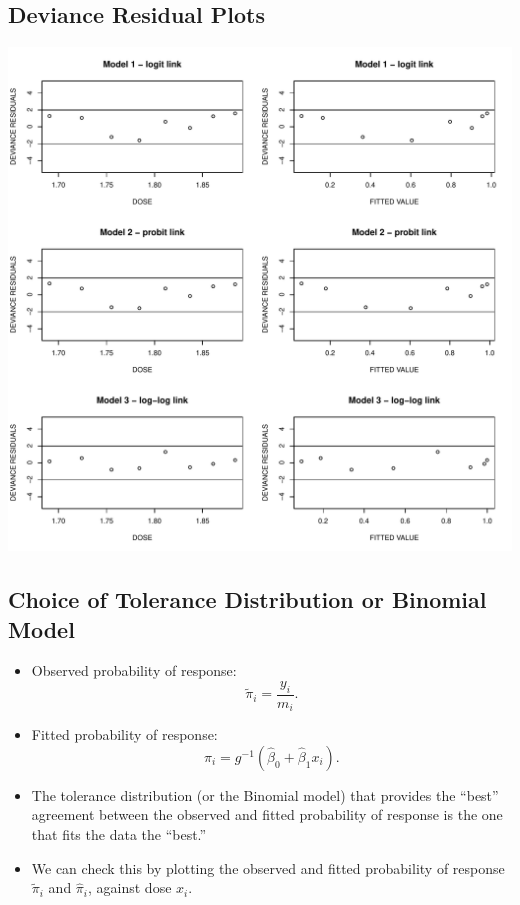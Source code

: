 \documentclass{article}\usepackage[]{graphicx}\usepackage[svgnames]{xcolor}
\makeatletter
\def\maxwidth{ %
  \ifdim\Gin@nat@width>\linewidth
    \linewidth
  \else
    \Gin@nat@width
  \fi
}
\newenvironment{knitrout}{}{} %
\makeatother
\begin{document}
\subsection*{Deviance Residual Plots}
\begin{knitrout}
\color{fgcolor}

{\centering \includegraphics[width=\maxwidth]{figure/unnamed-chunk-47-1} 

}


\end{knitrout}
\subsection*{Choice of Tolerance Distribution or Binomial Model}
\begin{itemize}
      \item Observed probability of response:
            \[ \tilde{\pi}_i=\frac{y_i}{m_i}. \]
      \item Fitted probability of response:
            \[ \hat{\pi}_i=g^{-1}(\hat{\beta}_0+\hat{\beta}_1x_i). \]
      \item The tolerance distribution (or the Binomial model) that provides the ``best''
            agreement between the observed and fitted probability of response is the one that fits the data the ``best.''
      \item We can check this by plotting the observed and fitted probability of response $ \tilde{\pi}_i $ and $ \hat{\pi}_i $,
            against dose $ x_i $.
\end{itemize}
\end{document}

